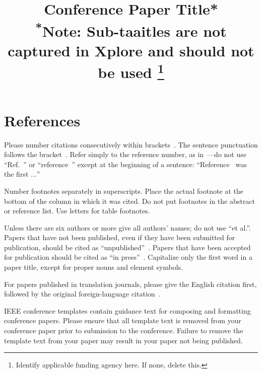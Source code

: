 \documentclass[conference]{IEEEtran}
\begin{document}
\title{Conference Paper Title*\\
{\footnotesize \textsuperscript{*}Note: Sub-taaitles are not captured in Xplore and
should not be used}
\thanks{Identify applicable funding agency here. If none, delete this.}
}



\maketitle










\section*{References}

Please number citations consecutively within brackets\ \cite{b1}. The
sentence punctuation follows the bracket\ \cite{b2}. Refer simply to the reference
number, as in\ \cite{b3}---do not use ``Ref.\ \cite{b3}'' or ``reference\ \cite{b3}'' except at
the beginning of a sentence: ``Reference\ \cite{b3} was the first $\ldots$''

Number footnotes separately in superscripts. Place the actual footnote at
the bottom of the column in which it was cited. Do not put footnotes in the
abstract or reference list. Use letters for table footnotes.

Unless there are six authors or more give all authors' names; do not use
``\textnormal{et al.}''. Papers that have not been published, even if they have been
submitted for publication, should be cited as ``unpublished''\ \cite{b4}. Papers
that have been accepted for publication should be cited as ``in press''\ \cite{b5}.
Capitalize only the first word in a paper title, except for proper nouns and
element symbols.

For papers published in translation journals, please give the English
citation first, followed by the original foreign-language citation\ \cite{b6}.

\printbibliography{}


\vspace{12pt}
\color{red}
IEEE conference templates contain guidance text for composing and formatting conference papers. Please ensure that all template text is removed from your conference paper prior to submission to the conference. Failure to remove the template text from your paper may result in your paper not being published.
\end{document}
